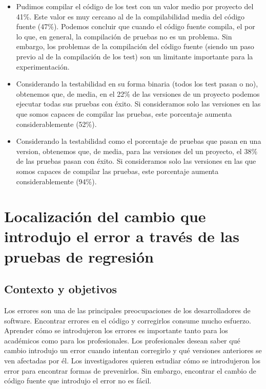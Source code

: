 \begin{itemize}
    \item Pudimos compilar el código de los test con un valor medio por proyecto del 41\%. Este valor es muy cercano al de la compilabilidad media del código fuente (47\%). Podemos concluir que cuando el código fuente compila, el por lo que, en general, la compilación de pruebas no es un problema. Sin embargo, los problemas de la compilación del código fuente (siendo un paso previo al de la compilación de los test) son un limitante importante para la experimentación.
    \item Considerando la testabilidad en su forma binaria (todos los test pasan o no), obtenemos que, de media, en el 22\% de las versiones de un proyecto podemos ejecutar todas sus pruebas con éxito. Si consideramos solo las versiones en las que somos capaces de compilar las pruebas, este porcentaje aumenta considerablemente (52\%).
    \item Considerando la testabilidad como el porcentaje de pruebas que pasan en una version, obtenemos que, de media, para las versiones del un proyecto, el 38\% de las pruebas pasan con éxito. Si consideramos solo las versiones en las que somos capaces de compilar las pruebas, este porcentaje aumenta considerablemente (94\%). 
\end{itemize}


\section{Localización del cambio que introdujo el error a través de las pruebas de regresión}
\label{sec:resumen:bug-hunter}

\subsection{Contexto y objetivos}

Los errores son una de las principales preocupaciones de los desarrolladores de software. 
Encontrar errores en el código y corregirlos consume mucho esfuerzo. 
Aprender cómo se introdujeron los errores es importante tanto para los académicos como para los profesionales. 
Los profesionales desean saber qué cambio introdujo un error cuando intentan corregirlo y qué versiones anteriores se ven afectadas por él. 
Los investigadores quieren estudiar cómo se introdujeron los error para encontrar formas de prevenirlos. 
Sin embargo, encontrar el cambio de código fuente que introdujo el error no es fácil.

